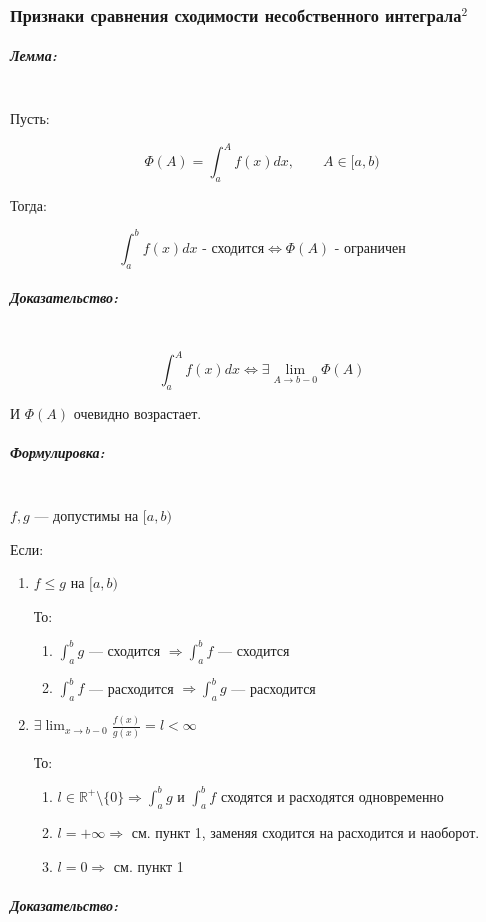 \documentclass{article}
\let\vanillasubparagraph\subparagraph
\renewcommand{\subparagraph}[1]{\vanillasubparagraph{#1}\mbox{}\\}
\begin{document}
\subsubsection{Признаки сравнения сходимости несобственного интеграла\texorpdfstring{$^2$}{}}
\subparagraph{Лемма:}

Пусть:

$$
\Phi(A) = \int_a^Af(x) dx, \qquad A \in [a, b)
$$

Тогда:

$$
\int_a^b f(x)dx \text{ - сходится} \Leftrightarrow \Phi(A) \text{ - ограничен}
$$

\subparagraph{Доказательство:}

$$
\int_a ^A f(x)dx \Leftrightarrow \exists \lim_{A\to b-0}\Phi(A)
$$

И $\Phi(A)$ очевидно возрастает.

\subparagraph{Формулировка:}

$f, g$ --- допустимы на $[a, b)$

Если:
\begin{enumerate}
    \item $f \le g$ на $[a, b)$

        То: 

        \begin{enumerate}
            \item $\int_a^b g$ --- сходится $\Rightarrow   \int_a^b f$ --- сходится
            \item $\int_a^b f$ --- расходится $\Rightarrow \int_a^b g$ --- расходится
\end{enumerate}
    \item $\exists \lim_{x \rightarrow b - 0} {\frac{f(x)}{g(x)}} = l < \infty$

        То:

        \begin{enumerate}
            \item $l \in \mathbb{R}^+$\textbackslash $\{0\} \Rightarrow \int_a^bg \text{ и } \int_a^bf$ сходятся и расходятся одновременно
            \item $l = + \infty \Rightarrow$ см. пункт 1, заменяя сходится на расходится и наоборот.
            \item $l = 0 \Rightarrow$ см. пункт 1 
        \end{enumerate}
\end{enumerate}

\subparagraph{Доказательство:}
\end{document}
